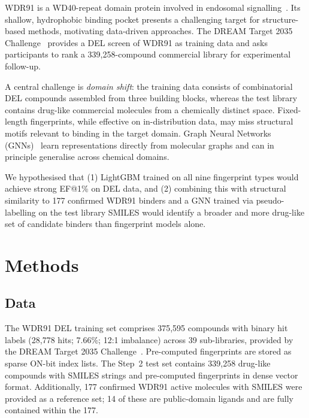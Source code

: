 \documentclass[10pt, letterpaper]{article}
\begin{document}
WDR91 is a WD40-repeat domain protein involved in endosomal signalling~\cite{Jia2016}. Its shallow, hydrophobic binding pocket presents a challenging target for structure-based methods, motivating data-driven approaches. The DREAM Target 2035 Challenge~\cite{DREAM2035} provides a DEL screen of WDR91 as training data and asks participants to rank a 339,258-compound commercial library for experimental follow-up.

A central challenge is \emph{domain shift}: the training data consists of combinatorial DEL compounds assembled from three building blocks, whereas the test library contains drug-like commercial molecules from a chemically distinct space. Fixed-length fingerprints, while effective on in-distribution data, may miss structural motifs relevant to binding in the target domain. Graph Neural Networks (GNNs)~\cite{Gilmer2017} learn representations directly from molecular graphs and can in principle generalise across chemical domains.

We hypothesised that (1) LightGBM trained on all nine fingerprint types would achieve strong EF@1\% on DEL data, and (2) combining this with structural similarity to 177 confirmed WDR91 binders and a GNN trained via pseudo-labelling on the test library SMILES would identify a broader and more drug-like set of candidate binders than fingerprint models alone.

\section{Methods}

\subsection{Data}
The WDR91 DEL training set comprises 375,595 compounds with binary hit labels (28,778 hits; 7.66\%; 12:1 imbalance) across 39 sub-libraries, provided by the DREAM Target 2035 Challenge~\cite{DREAM2035}. Pre-computed fingerprints are stored as sparse ON-bit index lists. The Step~2 test set contains 339,258 drug-like compounds with SMILES strings and pre-computed fingerprints in dense vector format. Additionally, 177 confirmed WDR91 active molecules with SMILES were provided as a reference set; 14 of these are public-domain ligands and are fully contained within the 177.
\end{document}
